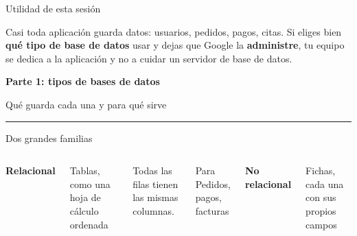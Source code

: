 \documentclass[aspectratio=169,10pt,c]{beamer}
\newcommand{\separador}[2]{%
\begin{frame}[plain]
\vfill
\begin{center}
{\fontsize{29}{34}\selectfont\bfseries #1}\par
\vspace{2mm}
{\small #2}\par
\vspace{4mm}
{\color{utpRojo}\rule{8.5cm}{1.2pt}}
\end{center}
\vfill
\end{frame}}
\begin{document}
\begin{frame}[c]{Utilidad de esta sesión}
\begin{center}
\begin{minipage}{.84\textwidth}
{\large Casi toda aplicación guarda datos: usuarios, pedidos, pagos, citas. Si eliges bien \textbf{qué tipo de base de datos} usar y dejas que Google la \textbf{administre}, tu equipo se dedica a la aplicación y no a cuidar un servidor de base de datos.}
\end{minipage}
\end{center}
\end{frame}

\separador{Parte 1: tipos de bases de datos}{Qué guarda cada una y para qué sirve}

\begin{frame}{Dos grandes familias}
\begin{columns}[T,onlytextwidth]
\centering
{\large\bfseries Relacional}\par\vspace{1mm}
{\small Tablas, como una hoja de cálculo ordenada}\par\vspace{3mm}
\par\vspace{3mm}
{\small Todas las filas tienen las mismas columnas.}\par\vspace{3mm}
\begin{exampleblock}{Para}
\small Pedidos, pagos, facturas
\end{exampleblock}
\centering
{\large\bfseries No relacional}\par\vspace{1mm}
{\small Fichas, cada una con sus propios campos}\par\vspace{3mm}

\end{columns}
\end{frame}
\end{document}
